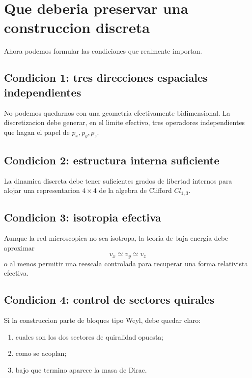 \section{Que deberia preservar una construccion discreta}

Ahora podemos formular las condiciones que realmente importan.

\subsection{Condicion 1: tres direcciones espaciales independientes}

No podemos quedarnos con una geometria efectivamente bidimensional. La discretizacion debe generar, en el limite efectivo, tres operadores independientes que hagan el papel de \(p_x,p_y,p_z\).

\subsection{Condicion 2: estructura interna suficiente}

La dinamica discreta debe tener suficientes grados de libertad internos para alojar una representacion \(4\times 4\) de la algebra de Clifford \(Cl_{1,3}\).

\subsection{Condicion 3: isotropia efectiva}

Aunque la red microscopica no sea isotropa, la teoria de baja energia debe aproximar
\begin{equation}
v_x \simeq v_y \simeq v_z
\end{equation}
o al menos permitir una reescala controlada para recuperar una forma relativista efectiva.

\subsection{Condicion 4: control de sectores quirales}

Si la construccion parte de bloques tipo Weyl, debe quedar claro:

\begin{enumerate}[leftmargin=*]
  \item cuales son los dos sectores de quiralidad opuesta;
  \item como se acoplan;
  \item bajo que termino aparece la masa de Dirac.
\end{enumerate}

